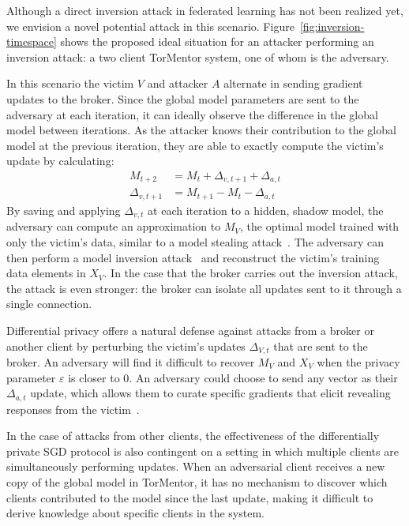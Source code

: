 Although a direct inversion attack in federated learning has not
been realized yet, we envision a novel potential attack in this
scenario. Figure~\ref{fig:inversion-timespace} shows the proposed ideal
situation for an attacker performing an inversion attack: a two client
TorMentor system, one of whom is the adversary.

In this scenario the victim $V$ and attacker $A$ alternate in sending
gradient updates to the broker. Since the global model parameters are
sent to the adversary at each iteration, it can ideally observe the
difference in the global model between iterations. As the attacker
knows their contribution to the global model at the previous
iteration, they are able to exactly compute the victim's update by
calculating:
\begin{align*}
  M_{t+2} &= M_t + \Delta_{v,t+1} + \Delta_{a,t} \\
  \Delta_{v,t+1} &= M_{t+1} - M_t - \Delta_{a,t}
\end{align*}
By saving and applying $\Delta_{v,t}$ at each iteration to a hidden,
shadow model, the adversary can compute an approximation to $M_V$,
the optimal model trained with only the victim's data, similar to a
model stealing attack~\cite{Tramer:2016}. The adversary can then
perform a model inversion attack~\cite{Fredrikson:2014,
Fredrikson:2015} and reconstruct the victim's training data elements
in $X_V$. In the case that the broker carries out the inversion attack,
the attack is even stronger: the broker can isolate all updates sent to
it through a single connection.

Differential privacy offers a natural defense against attacks from a
broker or another client by perturbing the victim's updates $\Delta_
{V,t}$ that are sent to the broker. An adversary will find it difficult
to recover $M_V$ and $X_V$ when the privacy parameter $\varepsilon$ is
closer to 0. An adversary could choose to send any vector as their
$\Delta_{a,t}$ update, which allows them to curate specific gradients
that elicit revealing responses from the victim~\cite{Hitaj:2017}.

In the case of attacks from other clients, the effectiveness of
the differentially private SGD protocol is also contingent on a setting
in which multiple clients are simultaneously performing updates. When
an adversarial client receives a new copy of the global model in
TorMentor, it has no mechanism to discover which clients contributed to
the model since the last update, making it difficult to derive
knowledge about specific clients in the system. 

